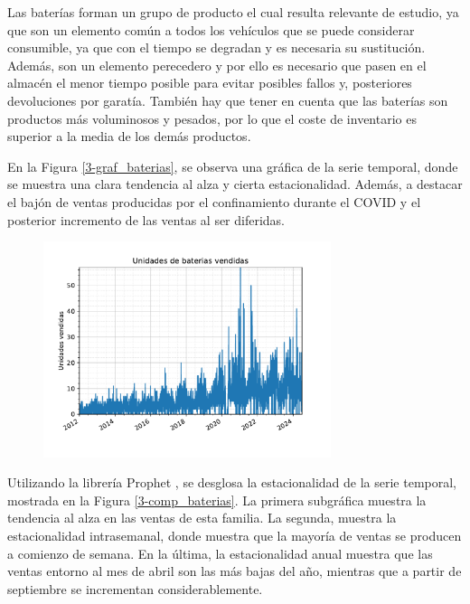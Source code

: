 Las baterías forman un grupo de producto el cual resulta relevante de estudio, ya que son un elemento común a todos los vehículos que se puede considerar consumible, ya que con el tiempo se degradan y es necesaria su sustitución. Además, son un elemento perecedero y por ello es necesario que pasen en el almacén el menor tiempo posible para evitar posibles fallos y, posteriores devoluciones por garatía. También hay que tener en cuenta que las baterías son productos más voluminosos y pesados, por lo que el coste de inventario es superior a la media de los demás productos.

En la Figura \ref*{3-graf_baterias}, se observa una gráfica de la serie temporal, donde se muestra una clara tendencia al alza y cierta estacionalidad. Además, a destacar el bajón de ventas producidas por el confinamiento durante el COVID y el posterior incremento de las ventas al ser diferidas.

\begin{figure}[H]
	{\includegraphics[width=0.75\textwidth]{imagenes/grafica_baterias.pdf}}
\end{figure}

Utilizando la librería Prophet \cite{prophet}, se desglosa la estacionalidad de la serie temporal, mostrada en la Figura \ref*{3-comp_baterias}. La primera subgráfica muestra la tendencia al alza en las ventas de esta familia. La segunda, muestra la estacionalidad intrasemanal, donde muestra que la mayoría de ventas se producen a comienzo de semana. En la última, la estacionalidad anual muestra que las ventas entorno al mes de abril son las más bajas del año, mientras que a partir de septiembre se incrementan considerablemente.

